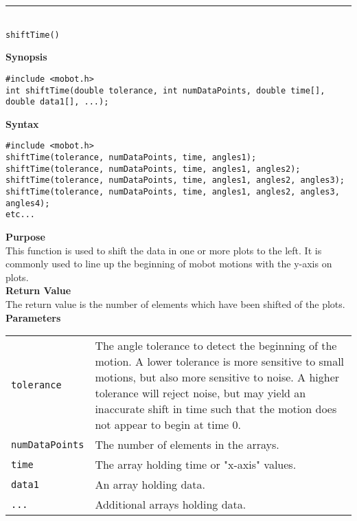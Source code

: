 \noindent
\vspace{5pt}
\rule{4.5in}{0.015in}\\
\noindent
{\LARGE \texttt{shiftTime()}}\\
{}

\noindent
{\bf Synopsis}
\vspace{-8pt}
\begin{verbatim}
#include <mobot.h>
int shiftTime(double tolerance, int numDataPoints, double time[], double data1[], ...);
\end{verbatim}

\noindent
{\bf Syntax}
\vspace{-8pt}
\begin{verbatim}
#include <mobot.h>
shiftTime(tolerance, numDataPoints, time, angles1);
shiftTime(tolerance, numDataPoints, time, angles1, angles2);
shiftTime(tolerance, numDataPoints, time, angles1, angles2, angles3);
shiftTime(tolerance, numDataPoints, time, angles1, angles2, angles3, angles4);
etc...
\end{verbatim}

\noindent
{\bf Purpose}\\
This function is used to shift the data in one or more plots to the left. It is commonly used to
line up the beginning of mobot motions with the y-axis on plots.\\

\noindent
{\bf Return Value}\\
The return value is the number of elements which have been shifted of the plots. \\

\noindent
{\bf Parameters}
\vspace{-0.1in}
\begin{description}
\item               
\begin{tabular}{p{25 mm}p{145 mm}}
\texttt{tolerance} & The angle tolerance to detect the beginning of the motion. A lower tolerance
is more sensitive to small motions, but also more sensitive to noise. A higher tolerance will
reject noise, but may yield an inaccurate shift in time such that the motion does not appear to
begin at time 0. \\
\texttt{numDataPoints} & The number of elements in the arrays. \\
\texttt{time} & The array holding time or "x-axis" values. \\
\texttt{data1} & An array holding data. \\
\texttt{...} & Additional arrays holding data. 
\end{tabular}
\end{description}

